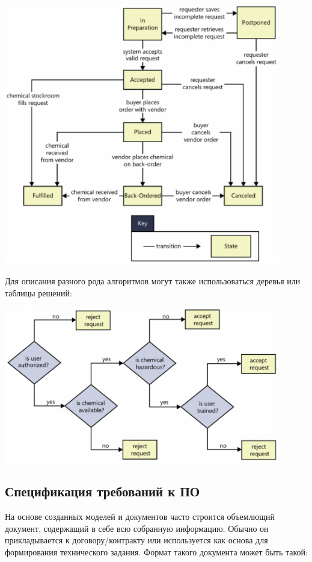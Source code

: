 \documentclass{../../text-style}
\begin{document}
\begin{center}
    \includegraphics[width=0.9\textwidth]{stateDiagram.png}
\end{center}

Для описания разного рода алгоритмов могут также использоваться деревья или таблицы решений:

\begin{center}
    \includegraphics[width=0.9\textwidth]{decisionTrees.png}
\end{center}

\subsection{Спецификация требований к ПО}

На основе созданных моделей и документов часто строится объемлющий документ, содержащий в себе всю собранную информацию. Обычно он прикладывается к договору/контракту или используется как основа для формирования технического задания. Формат такого документа может быть такой:
\end{document}
